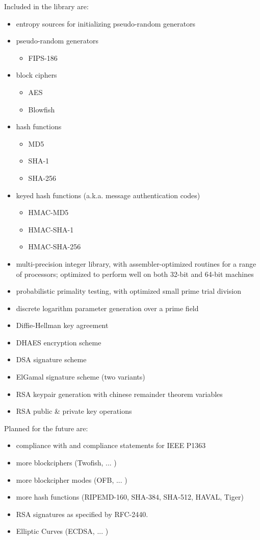 Included in the library are: \begin{itemize}
\item entropy sources for initializing pseudo-random generators \item pseudo-random generators \begin{itemize}
\item FIPS-186 \end{itemize}
\item block ciphers \begin{itemize}
\item AES \item Blowfish \end{itemize}
\item hash functions \begin{itemize}
\item MD5 \item SHA-1 \item SHA-256 \end{itemize}
\item keyed hash functions (a.k.a. message authentication codes) \begin{itemize}
\item HMAC-MD5 \item HMAC-SHA-1 \item HMAC-SHA-256 \end{itemize}
\item multi-precision integer library, with assembler-optimized routines for a range of processors; optimized to perform well on both 32-bit and 64-bit machines \item probabilistic primality testing, with optimized small prime trial division \item discrete logarithm parameter generation over a prime field \item Diffie-Hellman key agreement \item DHAES encryption scheme \item DSA signature scheme \item El\-Gamal signature scheme (two variants) \item RSA keypair generation with chinese remainder theorem variables \item RSA public \& private key operations \end{itemize}


Planned for the future are: \begin{itemize}
\item compliance with and compliance statements for IEEE P1363 \item more blockciphers (Twofish, ... ) \item more blockcipher modes (OFB, ... ) \item more hash functions (RIPEMD-160, SHA-384, SHA-512, HAVAL, Tiger) \item RSA signatures as specified by RFC-2440. \item Elliptic Curves (ECDSA, ... ) \end{itemize}


